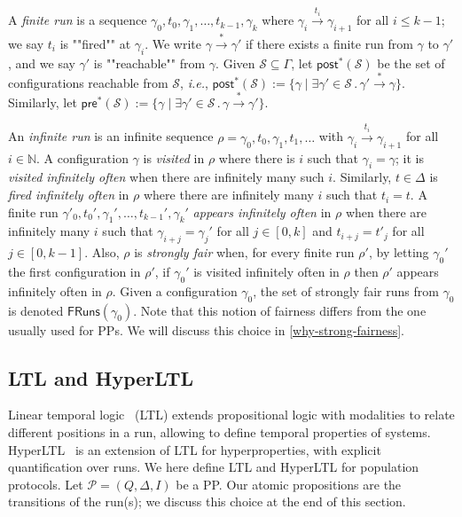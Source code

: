 \documentclass[10pt,a4paper]{article}
\let\mathbb\mathds
\renewcommand{\leq}{\leqslant}
\newcommand{\nats}{\mathbb{N}}
\newcommand{\set}[1]{\{#1\}}
\newcommand{\nset}[2]{[#1,#2]}
\newcommand{\deff}{:=}
\newcommand{\prot}{\mathcal{P}}
\newcommand{\fairrunsfrom}[1]{\mathsf{FRuns}(#1)}
\newcommand{\config}{\gamma}
\newcommand{\configs}{\Gamma}
\newcommand{\initialstates}{I}
\newcommand{\preop}{\mathsf{pre}}
\newcommand{\postop}{\mathsf{post}}
\newcommand{\prestar}[1]{\preop^*(#1)}
\newcommand{\poststar}[1]{\postop^*(#1)}
\newcommand{\step}[1]{\xrightarrow{#1}}
\newcommand{\run}{\rho}
\newcommand{\transitions}{\Delta}
\newcommand*{\states}{Q}
\newcommand*{\atrans}{t}
\newcommand{\trans}[1]{\xrightarrow{#1}}       %
\newcommand{\cSet}{\mathcal{S}}  %
\begin{document}
A \emph{finite run} is a sequence \(\config_0, \atrans_0, \config_1,\dots, \atrans_{k-1}, \config_k\) where \(\config_i \step{\atrans_{i}} \config_{i+1}\) for all \(i\leq k-1\); we say \(\atrans_{i}\) is ""fired"" at \(\config_i\).
We write \(\config \trans{*} \config'\) if there exists a finite run from \(\config\) to \(\config'\), and we say \(\config'\) is ""reachable"" from \(\config\).
Given \(\cSet \subseteq \configs\), let \(\poststar{\cSet}\) be the set of configurations reachable from \(\cSet\), \emph{i.e.}, \( \poststar{\cSet} \deff \set{ \config \mid \exists \config' \in \cSet \, .
	\, \config' \trans{*} \config}\).
Similarly, let \(\prestar{\cSet} \deff \set{\config \mid \exists \config' \in \cSet \, .
	\, \config \trans{*} \config'}\).

An \emph{infinite run} is an infinite sequence \(\run = \config_0,\atrans_0,\config_1,\atrans_1,\dots\) with \(\config_i \step{\atrans_{i}} \config_{i+1}\) for all \(i\in \nats\).
A configuration \(\config\) is \emph{visited} in \(\run\) where there is \(i\) such that \(\config_i = \config\); it is \emph{visited infinitely often} when there are infinitely many such \(i\).
Similarly, \(t \in \transitions\) is \emph{fired infinitely often} in \(\run\) where there are infinitely many \(i\) such that \(\atrans_i = t\).
A finite run \(\config'_0, \atrans_0', \config_1',\dots,\atrans_{k-1}', \config_k'\) \emph{appears infinitely often} in \(\run\) when there are infinitely many \(i\) such that \(\config_{i+j} = \config_j'\) for all \(j \in \nset{0}{k}\) and \(\atrans_{i+j} = \atrans'_j\) for all \(j \in \nset{0}{k-1}\).
Also, \(\run\) is \emph{strongly fair} when, for every finite run \(\run'\), by letting \(\config_0'\) the first configuration in \(\run'\), if \(\config_0'\) is visited infinitely often in \(\run\) then \(\run'\) appears infinitely often in \(\run\).
Given a configuration \(\config_0\), the set of strongly fair runs from \(\config_0\) is denoted \(\fairrunsfrom{\config_0}\).
Note that this notion of fairness differs from the one usually used for PPs.
%
%
We will discuss this choice in \cref{why-strong-fairness}.

%

%
%
\subsection{LTL and HyperLTL}
Linear temporal logic~\cite{pnueli77temporal} (LTL) extends propositional logic with modalities to relate different positions in a run, allowing to define temporal properties of systems.
HyperLTL~\cite{clarkson14temporal} is an extension of LTL for hyperproperties, with explicit quantification over runs.
We here define LTL and HyperLTL for population protocols.
Let \(\prot = (\states, \transitions, \initialstates)\) be a PP.
Our atomic propositions are the transitions of the run(s); we discuss this choice at the end of this section.
%
\end{document}
